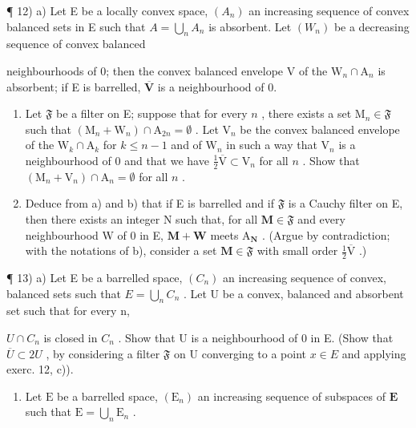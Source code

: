 ¶ 12) a) Let E be a locally convex space, \((A_n)\) an increasing sequence of convex balanced sets in E such that \(A = \bigcup_{n} A_n\) is absorbent. Let \((W_n)\) be a decreasing sequence of convex balanced

neighbourhoods of 0; then the convex balanced envelope V of the \(\mathrm{W}_n\cap \mathrm{A}_n\) is absorbent; if E is barrelled, \(\overline{\mathbf{V}}\) is a neighbourhood of 0.

\begin{enumerate}
\def\labelenumi{\alph{enumi})}
\setcounter{enumi}{1}
\item
  Let \(\mathfrak{F}\) be a filter on E; suppose that for every \(n\) , there exists a set \(\mathrm{M}_n \in \mathfrak{F}\) such that \((\mathrm{M}_n + \mathrm{W}_n) \cap \mathrm{A}_{2n} = \emptyset\) . Let \(\mathrm{V}_n\) be the convex balanced envelope of the \(\mathrm{W}_k \cap \mathrm{A}_k\) for \(k \leqslant n - 1\) and of \(\mathrm{W}_n\) in such a way that \(\mathrm{V}_n\) is a neighbourhood of 0 and that we have \(\frac{1}{2}\overline{\mathrm{V}} \subset \mathrm{V}_n\) for all \(n\) . Show that \((\mathrm{M}_n + \mathrm{V}_n) \cap \mathrm{A}_n = \emptyset\) for all \(n\) .
\item
  Deduce from a) and b) that if E is barrelled and if \(\mathfrak{F}\) is a Cauchy filter on E, then there exists an integer N such that, for all \(\mathbf{M} \in \mathfrak{F}\) and every neighbourhood W of 0 in E, \(\mathbf{M} + \mathbf{W}\) meets \(\mathrm{A}_{\mathbf{N}}\) . (Argue by contradiction; with the notations of b), consider a set \(\mathbf{M} \in \mathfrak{F}\) with small order \(\frac{1}{2}\overline{\mathrm{V}}\) .)
\end{enumerate}

¶ 13) a) Let E be a barrelled space, \((C_n)\) an increasing sequence of convex, balanced sets such that \(E = \bigcup_{n} C_n\) . Let U be a convex, balanced and absorbent set such that for every n,

\(U \cap C_{n}\) is closed in \(C_{n}\) . Show that U is a neighbourhood of 0 in E. (Show that \(\overline{U} \subset 2U\) , by considering a filter \(\mathfrak{F}\) on U converging to a point \(x \in E\) and applying exerc. 12, c)).

\begin{enumerate}
\def\labelenumi{\alph{enumi})}
\setcounter{enumi}{1}
\tightlist
\item
  Let \(\mathrm{E}\) be a barrelled space, \((\mathrm{E}_n)\) an increasing sequence of subspaces of \(\mathbf{E}\) such that \(\mathrm{E} = \bigcup_{n} \mathrm{E}_n\) .
\end{enumerate}

